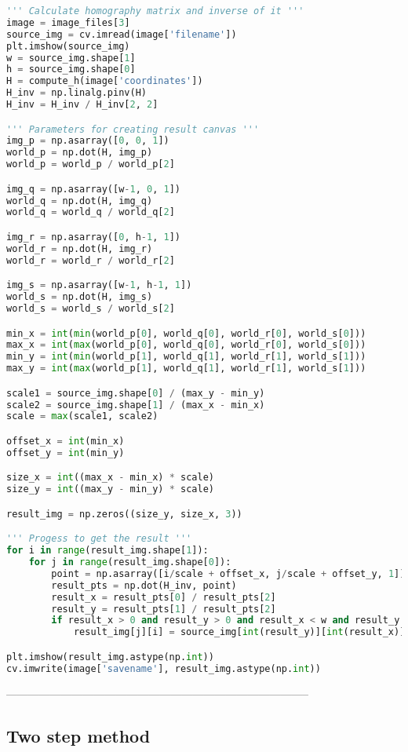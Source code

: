 \documentclass[11pt]{article}
\begin{document}
\begin{lstlisting}[language=Python, showstringspaces=false]
''' Calculate homography matrix and inverse of it '''
image = image_files[3]
source_img = cv.imread(image['filename'])
plt.imshow(source_img)
w = source_img.shape[1]
h = source_img.shape[0]
H = compute_h(image['coordinates'])
H_inv = np.linalg.pinv(H)
H_inv = H_inv / H_inv[2, 2]

''' Parameters for creating result canvas '''
img_p = np.asarray([0, 0, 1])
world_p = np.dot(H, img_p)
world_p = world_p / world_p[2]

img_q = np.asarray([w-1, 0, 1])
world_q = np.dot(H, img_q)
world_q = world_q / world_q[2]

img_r = np.asarray([0, h-1, 1])
world_r = np.dot(H, img_r)
world_r = world_r / world_r[2]

img_s = np.asarray([w-1, h-1, 1])
world_s = np.dot(H, img_s)
world_s = world_s / world_s[2]

min_x = int(min(world_p[0], world_q[0], world_r[0], world_s[0]))
max_x = int(max(world_p[0], world_q[0], world_r[0], world_s[0]))
min_y = int(min(world_p[1], world_q[1], world_r[1], world_s[1]))
max_y = int(max(world_p[1], world_q[1], world_r[1], world_s[1]))

scale1 = source_img.shape[0] / (max_y - min_y)
scale2 = source_img.shape[1] / (max_x - min_x)
scale = max(scale1, scale2)

offset_x = int(min_x) 
offset_y = int(min_y) 

size_x = int((max_x - min_x) * scale)
size_y = int((max_y - min_y) * scale)

result_img = np.zeros((size_y, size_x, 3))

''' Progess to get the result '''
for i in range(result_img.shape[1]):
    for j in range(result_img.shape[0]):
        point = np.asarray([i/scale + offset_x, j/scale + offset_y, 1])
        result_pts = np.dot(H_inv, point)
        result_x = result_pts[0] / result_pts[2]
        result_y = result_pts[1] / result_pts[2]
        if result_x > 0 and result_y > 0 and result_x < w and result_y < h:
            result_img[j][i] = source_img[int(result_y)][int(result_x)]

plt.imshow(result_img.astype(np.int))
cv.imwrite(image['savename'], result_img.astype(np.int))
\end{lstlisting}

-----------------------------------------------------------------------------------

\subsection*{Two step method}
\end{document}

